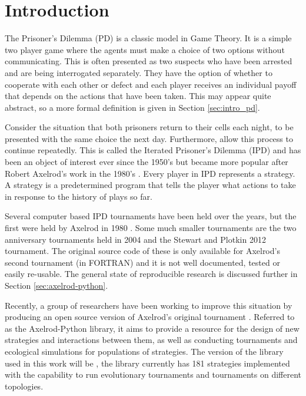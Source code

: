 
\chapter{Introduction}\label{cha:introduction}

The Prisoner's Dilemma (PD) is a classic model in Game Theory.
It is a simple two player game where the agents must make a choice of two options without communicating.
This is often presented as two suspects who have been arrested and are being interrogated separately.
They have the option of whether to cooperate with each other or defect and each player receives an individual payoff that depends on the actions that have been taken.
This may appear quite abstract, so a more formal definition is given in Section \ref{sec:intro_pd}.

Consider the situation that both prisoners return to their cells each night, to be presented with the same choice the next day.
Furthermore, allow this process to continue repeatedly.
This is called the Iterated Prisoner's Dilemma (IPD) and has been an object of interest ever since the 1950's but became more popular after Robert Axelrod's work in the 1980's \cite{Axelrod1980a, Axelrod1980b}.
Every player in IPD represents a strategy. A strategy is a predetermined program that tells the player what actions to take in response to the history of plays so far.

Several computer based IPD tournaments have been held over the years, but the first were held by Axelrod in 1980 \cite{Axelrod1980a, Axelrod1980b}.
Some much smaller tournaments are the two anniversary tournaments held in 2004 and the Stewart and Plotkin 2012 tournament.
The original source code of these is only available for Axelrod's second tournament (in FORTRAN) and it is not well documented, tested or easily re-usable.
The general state of reproducible research is discussed further in Section \ref{sec:axelrod-python}.

Recently, a group of researchers have been working to improve this situation by producing an open source version of Axelrod's original tournament \cite{Knight2016}.
Referred to as the Axelrod-Python library, it aims to provide a resource for the design of new strategies and interactions between them, as well as conducting tournaments and ecological simulations for populations of strategies.
The version of the library used in this work will be \cite{axelrodproject}, the library currently has 181 strategies implemented with the capability to run evolutionary tournaments and tournaments on different topologies.


